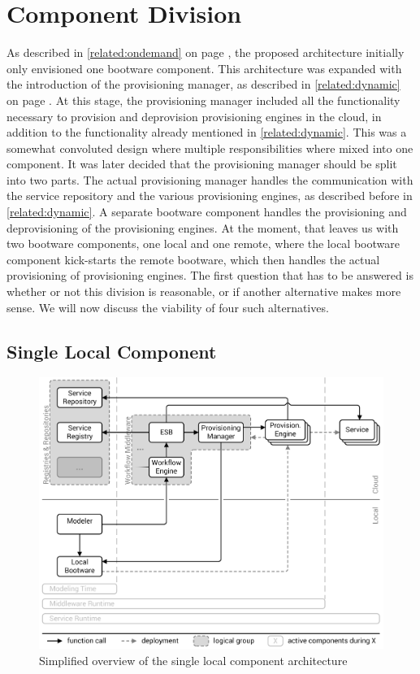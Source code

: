 \section{Component Division}
\label{design:division}

As described in \autoref{related:ondemand} on page \pageref{related:ondemand}, the proposed architecture initially only envisioned one bootware component.
This architecture was expanded with the introduction of the provisioning manager, as described in \autoref{related:dynamic} on page \pageref{related:dynamic}.
At this stage, the provisioning manager included all the functionality necessary to provision and deprovision provisioning engines in the cloud, in addition to the functionality already mentioned in \autoref{related:dynamic}.
This was a somewhat convoluted design where multiple responsibilities where mixed into one component.
It was later decided that the provisioning manager should be split into two parts.
The actual provisioning manager handles the communication with the service repository and the various provisioning engines, as described before in \autoref{related:dynamic}.
A separate bootware component handles the provisioning and deprovisioning of the provisioning engines.
At the moment, that leaves us with two bootware components, one local and one remote, where the local bootware component kick-starts the remote bootware, which then handles the actual provisioning of provisioning engines.
The first question that has to be answered is whether or not this division is reasonable, or if another alternative makes more sense.
We will now discuss the viability of four such alternatives.

\subsection{Single Local Component}

\begin{figure}[!htbp]
	\centering
	\includegraphics[resolution=600]{design/assets/local}
	\caption{Simplified overview of the single local component architecture}
	\label{image:local}
\end{figure}

